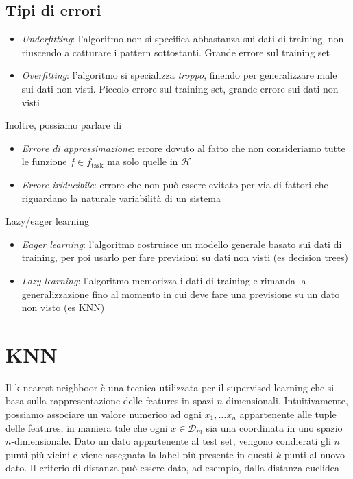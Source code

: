\subsection{Tipi di errori}
\begin{itemize}
	\item \textit{Underfitting}: l'algoritmo non si specifica abbastanza sui dati di training, non riuscendo a catturare i pattern sottostanti. Grande errore sul training set
	\item \textit{Overfitting}: l'algoritmo si specializza \textit{troppo}, finendo per generalizzare male sui dati non visti. Piccolo errore sul training set, grande errore sui dati non visti
\end{itemize}
Inoltre, possiamo parlare di
\begin{itemize}
	\item \textit{Errore di approssimazione}: errore dovuto al fatto che non consideriamo tutte le funzione $ f \in f_{\text{task}} $ ma solo quelle in $ \mathcal{H} $
	\item \textit{Errore iriducibile}: errore che non può essere evitato per via di fattori che riguardano la naturale variabilità di un sistema
\end{itemize}
\begin{definizione}{Lazy/eager learning}
	\begin{itemize}
		\item \textit{Eager learning}: l'algoritmo costruisce un modello generale basato sui dati di training, per poi usarlo per fare previsioni su dati non visti (es decision trees)
		\item \textit{Lazy learning}: l'algoritmo memorizza i dati di training e rimanda la generalizzazione fino al momento in cui deve fare una previsione su un dato non visto (es KNN)
	\end{itemize}
\end{definizione}
\section{KNN}
Il k-nearest-neighboor è una tecnica utilizzata per il supervised learning che si basa sulla rappresentazione delle features in spazi $ n $-dimensionali. Intuitivamente, possiamo associare un valore numerico ad ogni $ x_1,\ldots x_n $ appartenente alle tuple delle features, in maniera tale che ogni $ x \in \mathcal{D}_m $ sia una coordinata in uno spazio $ n $-dimensionale.
\vskip3mm
Dato un dato appartenente al test set, vengono condierati gli $ n $ punti più vicini e viene assegnata la label più presente in questi $ k $ punti al nuovo dato. Il criterio di distanza può essere dato, ad esempio, dalla distanza euclidea

